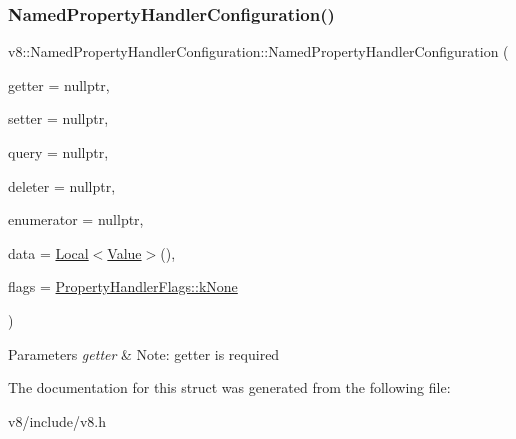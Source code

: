 \subsubsection{\texorpdfstring{Named\+Property\+Handler\+Configuration()}{NamedPropertyHandlerConfiguration()}}
{\footnotesize\ttfamily v8\+::\+Named\+Property\+Handler\+Configuration\+::\+Named\+Property\+Handler\+Configuration (\begin{DoxyParamCaption}\item[{\mbox{\hyperlink{namespacev8_a24b1801fa53a7c5a71366d8044927563}{Generic\+Named\+Property\+Getter\+Callback}}}]{getter = {\ttfamily nullptr},  }\item[{\mbox{\hyperlink{namespacev8_af74716c6e95a269c6cd4314662fd0a7e}{Generic\+Named\+Property\+Setter\+Callback}}}]{setter = {\ttfamily nullptr},  }\item[{\mbox{\hyperlink{namespacev8_add9f7ab11e4a9a2b9ad2c4536b0e1a64}{Generic\+Named\+Property\+Query\+Callback}}}]{query = {\ttfamily nullptr},  }\item[{\mbox{\hyperlink{namespacev8_ad2aecc0406ea4bc02d5a4f84a433b273}{Generic\+Named\+Property\+Deleter\+Callback}}}]{deleter = {\ttfamily nullptr},  }\item[{\mbox{\hyperlink{namespacev8_a20826eb7e52e84fa4f632534e8eddd04}{Generic\+Named\+Property\+Enumerator\+Callback}}}]{enumerator = {\ttfamily nullptr},  }\item[{\mbox{\hyperlink{classv8_1_1Local}{Local}}$<$ \mbox{\hyperlink{classv8_1_1Value}{Value}} $>$}]{data = {\ttfamily \mbox{\hyperlink{classv8_1_1Local}{Local}}$<$\mbox{\hyperlink{classv8_1_1Value}{Value}}$>$()},  }\item[{\mbox{\hyperlink{namespacev8_af4789f0aeb8680e353901a35810cac1a}{Property\+Handler\+Flags}}}]{flags = {\ttfamily \mbox{\hyperlink{namespacev8_af4789f0aeb8680e353901a35810cac1aa35c3ace1970663a16e5c65baa5941b13}{Property\+Handler\+Flags\+::k\+None}}} }\end{DoxyParamCaption})\hspace{0.3cm}{\ttfamily [inline]}}


\begin{DoxyParams}{Parameters}
{\em getter} & Note\+: getter is required \\
\hline
\end{DoxyParams}


The documentation for this struct was generated from the following file\+:\begin{DoxyCompactItemize}
\item 
v8/include/v8.\+h\end{DoxyCompactItemize}
